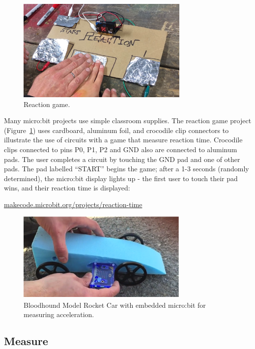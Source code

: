 

\begin{figure}[t]
    \includegraphics[width=3.3in]{images/reaction.jpg} 
    \caption{\label{fig:reaction}Reaction game.}
\end{figure}

Many micro:bit projects use simple classroom supplies. The reaction
game project (Figure~\ref{fig:reaction}) uses cardboard, aluminum foil, 
and crocodile clip connectors to illustrate the use of circuits with a game
that measure reaction time. Crocodile
clips connected to pins P0, P1, P2 and GND also are connected to aluminum
pads. The user completes a circuit by touching the GND pad and one of
other pads. The pad labelled ``START'' begins the game; after a 1-3
seconds (randomly determined), the micro:bit display lights up - the first
user to touch their pad wins, and their reaction time is displayed:
\begin{center}
    \small{\url{makecode.microbit.org/projects/reaction-time}}
\end{center}


\begin{figure}[t]
    \includegraphics[width=3.3in]{images/rocketcar.png} 
    \caption{\label{fig:rocketcar}Bloodhound Model Rocket Car with embedded micro:bit for
    measuring acceleration.}
\end{figure}

\subsection{Measure}

